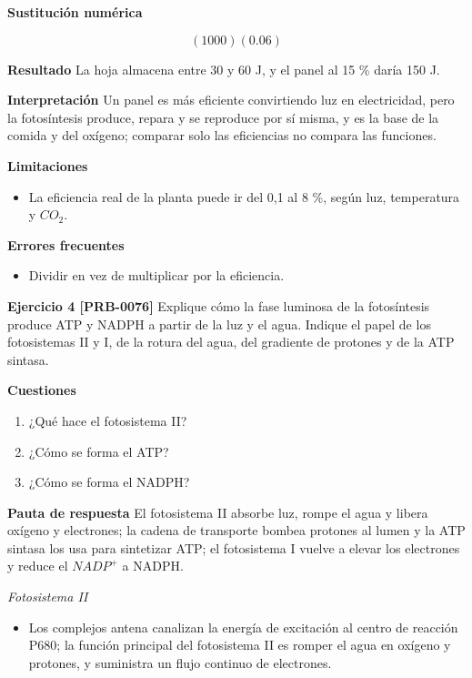 \documentclass{book}
\begin{document}
\noindent\textbf{Sustitución numérica}

\[
\left(1000\right) \left(0.06\right)
\]

\noindent\textbf{Resultado}
La hoja almacena entre 30 y 60 J, y el panel al 15 \% daría 150 J.


\noindent\textbf{Interpretación}
Un panel es más eficiente convirtiendo luz en electricidad, pero la fotosíntesis produce, repara y se reproduce por sí misma, y es la base de la comida y del oxígeno; comparar solo las eficiencias no compara las funciones.


\noindent\textbf{Limitaciones}
\begin{itemize}
\item La eficiencia real de la planta puede ir del 0,1 al 8 \%, según luz, temperatura y \(CO_{2}\).
\end{itemize}

\noindent\textbf{Errores frecuentes}
\begin{itemize}
\item Dividir en vez de multiplicar por la eficiencia.
\end{itemize}

\noindent\textbf{Ejercicio 4 [PRB-0076]}
Explique cómo la fase luminosa de la fotosíntesis produce ATP y NADPH a partir de la luz y el agua. Indique el papel de los fotosistemas II y I, de la rotura del agua, del gradiente de protones y de la ATP sintasa.


\noindent\textbf{Cuestiones}
\begin{enumerate}
\item ¿Qué hace el fotosistema II?
\item ¿Cómo se forma el ATP?
\item ¿Cómo se forma el NADPH?
\end{enumerate}

\noindent\textbf{Pauta de respuesta}
El fotosistema II absorbe luz, rompe el agua y libera oxígeno y electrones; la cadena de transporte bombea protones al lumen y la ATP sintasa los usa para sintetizar ATP; el fotosistema I vuelve a elevar los electrones y reduce el \(NADP^{+}\) a NADPH.


\noindent\textit{Fotosistema II}
\begin{itemize}
\item Los complejos antena canalizan la energía de excitación al centro de reacción P680; la función principal del fotosistema II es romper el agua en oxígeno y protones, y suministra un flujo continuo de electrones.
\end{itemize}
\end{document}
